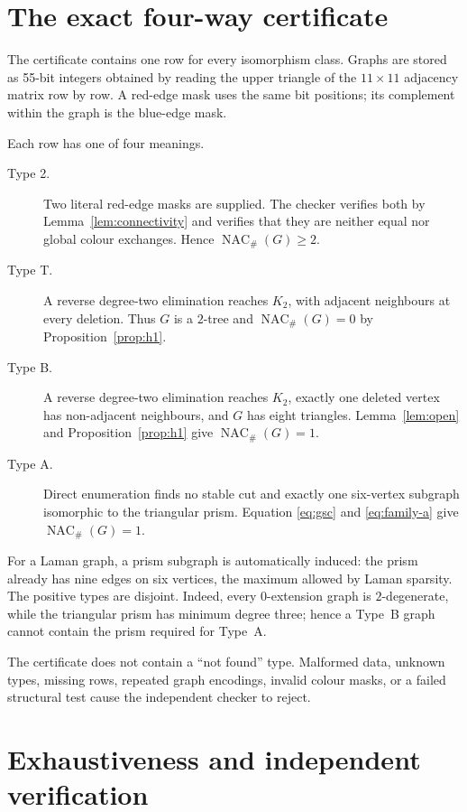 \documentclass[11pt]{amsart}
\theoremstyle{definition}
\newcommand{\NACnum}{\operatorname{NAC}_{\#}}
\begin{document}
\section{The exact four-way certificate}

The certificate contains one row for every isomorphism class.  Graphs are
stored as 55-bit integers obtained by reading the upper triangle of the
$11\times11$ adjacency matrix row by row.  A red-edge mask uses the same bit
positions; its complement within the graph is the blue-edge mask.

Each row has one of four meanings.

\begin{description}
\item[Type 2.] Two literal red-edge masks are supplied.  The checker verifies
both by Lemma~\ref{lem:connectivity} and verifies that they are neither equal
nor global colour exchanges.  Hence $\NACnum(G)\geq2$.
\item[Type T.] A reverse degree-two elimination reaches $K_2$, with adjacent
neighbours at every deletion.  Thus $G$ is a $2$-tree and
$\NACnum(G)=0$ by Proposition~\ref{prop:h1}.
\item[Type B.] A reverse degree-two elimination reaches $K_2$, exactly one
deleted vertex has non-adjacent neighbours, and $G$ has eight triangles.
Lemma~\ref{lem:open} and Proposition~\ref{prop:h1} give $\NACnum(G)=1$.
\item[Type A.] Direct enumeration finds no stable cut and exactly one
six-vertex subgraph isomorphic to the triangular prism.  Equation
\eqref{eq:gsc} and \eqref{eq:family-a} give $\NACnum(G)=1$.
\end{description}

For a Laman graph, a prism subgraph is automatically induced: the prism already
has nine edges on six vertices, the maximum allowed by Laman sparsity.
The positive types are disjoint.  Indeed, every $0$-extension graph is
$2$-degenerate, while the triangular prism has minimum degree three; hence a
Type~B graph cannot contain the prism required for Type~A.

The certificate does not contain a ``not found'' type.  Malformed data,
unknown types, missing rows, repeated graph encodings, invalid colour masks,
or a failed structural test cause the independent checker to reject.

\section{Exhaustiveness and independent verification}
\end{document}
